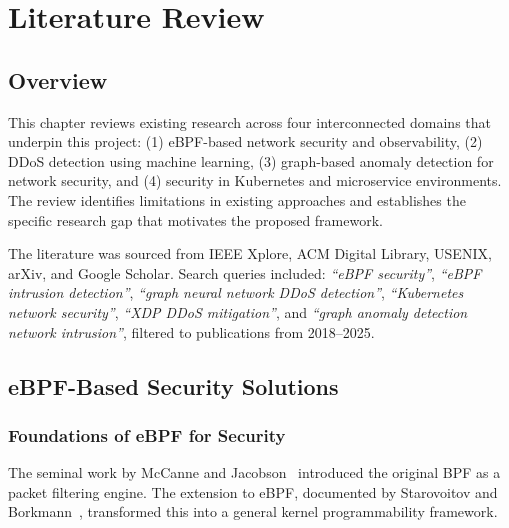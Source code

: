 \chapter{Literature Review}
\label{ch:literature}

\section{Overview}
\label{sec:lit_overview}

This chapter reviews existing research across four interconnected domains that underpin
this project: (1) eBPF-based network security and observability, (2) DDoS detection
using machine learning, (3) graph-based anomaly detection for network security, and
(4) security in Kubernetes and microservice environments. The review identifies
limitations in existing approaches and establishes the specific research gap that
motivates the proposed framework.

The literature was sourced from IEEE Xplore, ACM Digital Library, USENIX, arXiv, and
Google Scholar. Search queries included: \textit{``eBPF security''}, \textit{``eBPF
intrusion detection''}, \textit{``graph neural network DDoS detection''}, \textit{``Kubernetes
network security''}, \textit{``XDP DDoS mitigation''}, and \textit{``graph anomaly detection
network intrusion''}, filtered to publications from 2018--2025.

\section{eBPF-Based Security Solutions}
\label{sec:lit_ebpf}

\subsection{Foundations of eBPF for Security}

The seminal work by McCanne and Jacobson~\cite{mccanne1993bpf} introduced the original
BPF as a packet filtering engine. The extension to eBPF, documented by Starovoitov and
Borkmann~\cite{borkmann2014ebpf}, transformed this into a general kernel programmability
framework.

